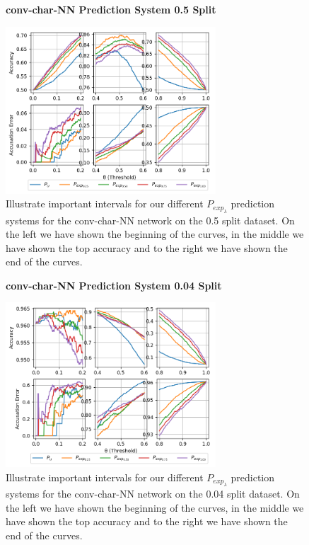 \begin{description}
        \begin{figure}
            \centering
            \textbf{\glsdesc{conv-char-NN} Prediction System 0.5 Split}\par\medskip
            \includegraphics[width=0.7\textwidth]{./pictures/discussion/conv_char_nn_prediction_zoom_50_time.png}
            \caption{Illustrate important intervals for our different
                $P_{exp_\lambda}$ prediction systems for the \gls{conv-char-NN}
                network on the 0.5 split dataset. On the left we have shown the
                beginning of the curves, in the middle we have shown the top
                accuracy and to the right we have shown the end of the curves.}
            \label{fig:conv_char_prediction_zoom_50}
        \end{figure}

        \begin{figure}
            \centering
            \textbf{\glsdesc{conv-char-NN} Prediction System 0.04 Split}\par\medskip
            \includegraphics[width=0.7\textwidth]{./pictures/discussion/conv_char_nn_prediction_zoom_04_time.png}
            \caption{Illustrate important intervals for our different
                $P_{exp_\lambda}$ prediction systems for the \gls{conv-char-NN}
                network on the 0.04 split dataset. On the left we have shown the
                beginning of the curves, in the middle we have shown the top
                accuracy and to the right we have shown the end of the curves.}
            \label{fig:conv_char_prediction_zoom_04}
        \end{figure}


\end{description}
